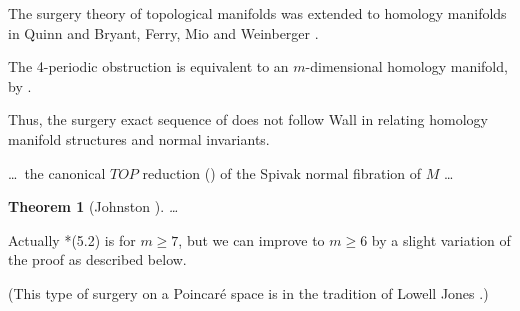 \documentclass{article}
\newtheorem{thm}{Theorem}[section]
\begin{document}
The surgery theory of topological manifolds
was extended to homology manifolds in Quinn
\cites{Q1,Q2} and Bryant, Ferry, Mio
and Weinberger \cite{BFMW}.

The 4-periodic obstruction is equivalent to
an $m$-dimensional homology manifold, by
\cite{BFMW}.

Thus, the surgery exact sequence of
\cite{BFMW} does not follow Wall \cite{Wa} in
relating homology manifold structures and
normal invariants.

\dots\ the canonical $TOP$ reduction
(\cite{FP}) of the Spivak normal fibration of
$M$ \dots

\begin{thm}[Johnston \cite{Jo}]
\dots
\end{thm}

Actually \cite{Jo}*{(5.2)} is for $m\geq 7$,
but we can improve to $m\geq 6$ by a slight
variation of the proof as described below.

(This type of surgery on a Poincar\'e space
is in the tradition of Lowell Jones
\cite{Jn}.)



\end{document}
